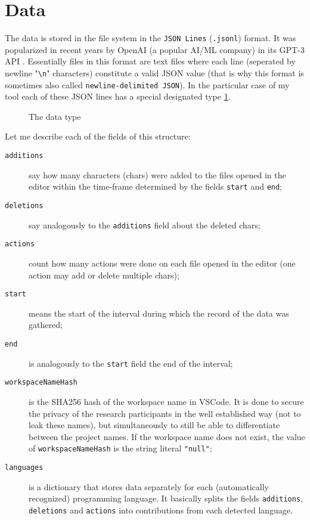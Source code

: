 \section{Data}

The data is stored in the file system in the \texttt{JSON Lines} (\texttt{.jsonl}) \cite{JSONLines} format. It was popularized in recent years by OpenAI (a popular AI/ML company) in its GPT-3 API \cite{OpenAIGPT3}. Essentially files in this format are text files where each line (seperated by newline "\verb"\n"" characters) constitute a valid JSON value (that is why this format is sometimes also called \texttt{newline-delimited JSON}). In the particular case of my tool each of these JSON lines has a special designated type \ref{fig:event_type}.

\begin{figure}[ht]
    \centering
    
    \caption{The data type}
    \label{fig:event_type}
\end{figure}

Let me describe each of the fields of this structure:
\begin{description}
    \item[\texttt{additions}] say how many characters (chars) were added to the files opened in the editor within the time-frame determined by the fields \texttt{start} and \texttt{end};
    \item[\texttt{deletions}] say analogously to the \texttt{additions} field about the deleted chars;
    \item[\texttt{actions}] count how many actions were done on each file opened in the editor (one action may add or delete multiple chars);
    \item[\texttt{start}] means the start of the interval during which the record of the data was gathered;
    \item[\texttt{end}] is analogously to the \texttt{start} field the end of the interval;
    \item[\texttt{workspaceNameHash}] is the SHA256 \cite{NIST02SHS} hash of the workspace name in VSCode. It is done to secure the privacy of the research participants in the well established way (not to leak these names), but simultaneously to still be able to differentiate between the project names. If the workspace name does not exist, the value of \texttt{workspaceNameHash} is the string literal \texttt{"null"};
    \item[\texttt{languages}] is a dictionary that stores data separately for each (automatically recognized) programming language. It basically splits the fields \texttt{additions}, \texttt{deletions} and \texttt{actions} into contributions from each detected language.
\end{description}





